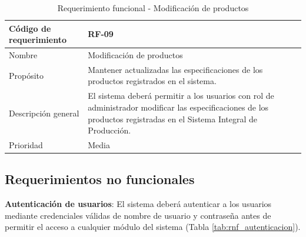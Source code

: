 \begin{table}[H]
    \centering
    \caption{Requerimiento funcional - Modificación de productos}
    \label{tab:req_productos}
    \begin{tabularx}{\textwidth}{|X|X|}
        \hline
        Código de requerimiento & RF-09                                                                                                                                                                \\ \hline
        Nombre                  & Modificación de productos                                                                                                                                            \\ \hline
        Propósito               & Mantener actualizadas las especificaciones de los productos registrados en el sistema.                                                                               \\ \hline
        Descripción general     & El sistema deberá permitir a los usuarios con rol de administrador modificar las especificaciones de los productos registradas en el Sistema Integral de Producción. \\ \hline
        Prioridad               & Media                                                                                                                                                                \\ \hline
    \end{tabularx}
\end{table}


\subsection{Requerimientos no funcionales}

\textbf{Autenticación de usuarios}: El sistema deberá autenticar a los usuarios mediante credenciales válidas de nombre de usuario y contraseña antes de permitir el acceso a cualquier módulo del sistema (Tabla \ref{tab:rnf_autenticacion}).

